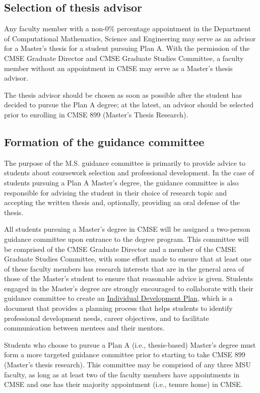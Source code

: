 \subsection{Selection of thesis advisor}

Any faculty member with a non-0\% percentage appointment in the
Department of Computational Mathematics, Science and Engineering may
serve as an advisor for a Master's thesis for a student pursuing Plan
A.  With the permission of the CMSE Graduate Director and CMSE
Graduate Studies Committee, a faculty member without an appointment in
CMSE may serve as a Master's thesis advisor.  

The thesis advisor should be
chosen as soon as possible after the student has decided to pursue the
Plan A degree; at the latest, an advisor should be selected prior to
enrolling in CMSE 899 (Master's Thesis Research).  


\subsection{Formation of the guidance committee}
\label{sec:ms_guidance_comm}

The purpose of the M.S. guidance committee is primarily to provide
advice to students about coursework selection and professional
development.  In the case of students pursuing a Plan A Master's
degree, the guidance committee is also responsible for advising the
student in their choice of research topic and accepting the written
thesis and, optionally, providing an oral defense of the thesis.

All students pursuing a Master's degree in CMSE will be assigned a
two-person guidance committee upon entrance to the degree program.
This committee will be comprised of the CMSE Graduate Director and a
member of the CMSE Graduate Studies Committee, with some effort made
to ensure that at least one of these faculty members has research
interests that are in the general area of those of the Master's
student to ensure that reasonable advice is given.  Students engaged
in the Master's degree are strongly encouraged to collaborate with
their guidance committee to create an
\href{http://caffe.grd.msu.edu/IDP}{Individual Development Plan},
which is a document that provides a planning process that helps
students to identify professional development needs, career
objectives, and to facilitate communication between mentees and their mentors.

Students who choose to pursue a Plan A (i.e., thesis-based) Master's
degree must form a more targeted guidance committee prior to starting
to take CMSE 899 (Master's thesis research).  This committee may be
comprised of any three MSU faculty, as long as at least two of the
faculty members have appointments in CMSE and one has their majority
appointment (i.e., tenure home) in CMSE.


